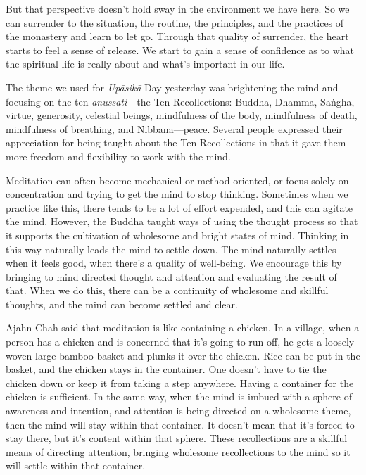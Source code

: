 But that perspective doesn't hold sway in the environment we have here. 
So we can surrender to the situation, the routine, the principles, and 
the practices of the monastery and learn to let go. Through that 
quality of surrender, the heart starts to feel a sense of release. We 
start to gain a sense of confidence as to what the spiritual life is 
really about and what's important in our life.


The theme we used for \emph{Upāsikā} Day yesterday was brightening 
the mind and focusing on the ten \emph{anussati}---the Ten 
Recollections: Buddha, Dhamma, Saṅgha, virtue, generosity, celestial 
beings, mindfulness of the body, mindfulness of death, mindfulness of 
breathing, and Nibbāna---peace. Several people expressed their 
appreciation for being taught about the Ten Recollections in that it 
gave them more freedom and flexibility to work with the mind.

Meditation can often become mechanical or method oriented, or focus 
solely on concentration and trying to get the mind to stop thinking. 
Sometimes when we practice like this, there tends to be a lot of effort 
expended, and this can agitate the mind. However, the Buddha taught 
ways of using the thought process so that it supports the cultivation 
of wholesome and bright states of mind. Thinking in this way naturally 
leads the mind to settle down. The mind naturally settles when it feels 
good, when there's a quality of well-being. We encourage this by 
bringing to mind directed thought and attention and evaluating the 
result of that. When we do this, there can be a continuity of wholesome 
and skillful thoughts, and the mind can become settled and clear.

Ajahn Chah said that meditation is like containing a chicken. In a 
village, when a person has a chicken and is concerned that it's going 
to run off, he gets a loosely woven large bamboo basket and plunks it 
over the chicken. Rice can be put in the basket, and the chicken stays 
in the container. One doesn't have to tie the chicken down or keep it 
from taking a step anywhere. Having a container for the chicken is 
sufficient. In the same way, when the mind is imbued with a sphere of 
awareness and intention, and attention is being directed on a wholesome 
theme, then the mind will stay within that container. It doesn't mean 
that it's forced to stay there, but it's content within that sphere. 
These recollections are a skillful means of directing attention, 
bringing wholesome recollections to the mind so it will settle within 
that container.

